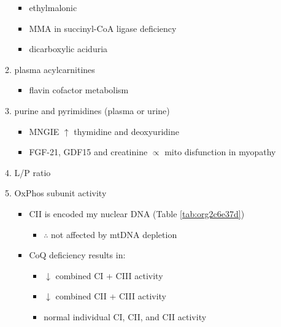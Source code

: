 \documentclass{scrartcl}
\begin{document}
\begin{enumerate}
\begin{enumerate}
\begin{itemize}
\item ethylmalonic
\item MMA in succinyl-CoA ligase deficiency
\item dicarboxylic aciduria
\end{itemize}
\item plasma acylcarnitines
\label{sec:orgabf4dd1}
\begin{itemize}
\item flavin cofactor metabolism
\end{itemize}
\item purine and pyrimidines (plasma or urine)
\label{sec:org68adf26}
\begin{itemize}
\item MNGIE \(\uparrow\) thymidine and deoxyuridine
\end{itemize}
\begin{itemize}
\item FGF-21, GDF15 and creatinine \(\propto\) mito disfunction in myopathy
\end{itemize}

\item L/P ratio
\label{sec:orgf5cfdf5}
\item OxPhos subunit activity
\label{sec:org427f5ac}
\begin{itemize}
\item CII is encoded my nuclear DNA (Table \ref{tab:org2c6e37d})
\begin{itemize}
\item \(\therefore\) not affected by mtDNA depletion
\end{itemize}
\item CoQ deficiency results in:
\begin{itemize}
\item \(\downarrow\) combined CI + CIII activity
\item \(\downarrow\) combined CII + CIII activity
\item normal individual CI, CII, and CII activity
\end{itemize}
\end{itemize}
\end{enumerate}


\end{enumerate}
\end{document}
